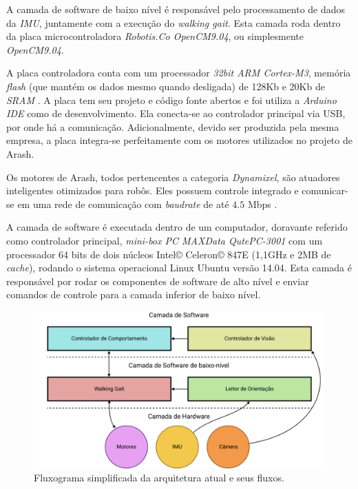 A camada de software de baixo nível é responsável pelo processamento de dados da \textit{IMU}, juntamente com a execução do \textit{walking gait}. Esta camada roda dentro da placa microcontroladora \textit{Robotis.Co OpenCM9.04}, ou simplesmente \textit{OpenCM9.04}.

A placa controladora conta com um processador \textit{32bit ARM Cortex-M3}, memória \textit{flash} (que mantém os dados mesmo quando desligada) de 128Kb e 20Kb de \textit{SRAM} \cite{opencm904}. A placa tem seu projeto e código fonte abertos e foi utiliza a \textit{Arduino IDE} como  de desenvolvimento. Ela conecta-se ao controlador principal via USB, por onde há a comunicação. Adicionalmente, devido ser produzida pela mesma empresa, a placa integra-se perfeitamente com os motores utilizados no projeto de Arash.

Os motores de Arash, todos pertencentes a categoria \textit{Dynamixel}, são atuadores inteligentes otimizados para robôs. Eles possuem controle  integrado e comunicar-se em uma rede de comunicação  com \textit{baudrate} de até $4.5$ Mbps \cite{dynamixel}.

A camada de software é executada dentro de um computador, doravante referido como controlador principal, \textit{mini-box PC MAXData QutePC-3001} com um processador 64 bits de dois núcleos Intel\copyright{} Celeron\copyright{} 847E (1,1GHz e 2MB de \textit{cache}), rodando o sistema operacional Linux Ubuntu versão 14.04. Esta camada é responsável por rodar os componentes de software de alto nível e enviar comandos de controle para a camada inferior de baixo nível.

\begin{figure}[htb]
	\centering
	\includegraphics[scale=1]{imagens/svg/softwarearchitecture-flow}
	\caption{Fluxograma simplificada da arquitetura atual e seus fluxos.}
	\label{fig:softwarearchitecture:overview}
\end{figure}

